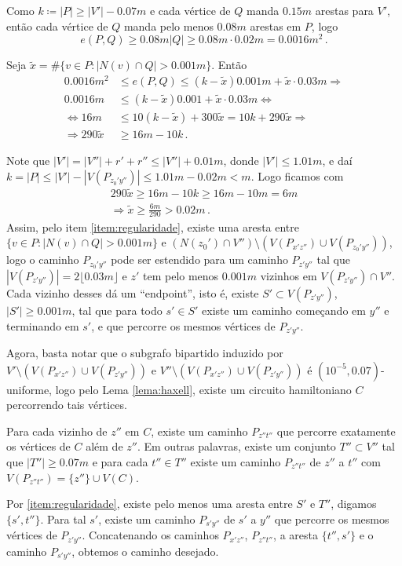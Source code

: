 \begin{dem}
	Como $k\coloneqq |P|\geq |V'| - 0.07m$ e cada vértice de $Q$ manda $0.15m$ arestas para $V'$, então cada vértice de $Q$ manda pelo menos $0.08m$ arestas em $P$, logo
	\[
		e(P,Q)\geq0.08m|Q|\geq0.08m\cdot0.02m = 0.0016m^2\,.
	\]
	
	Seja $\tilde{x} = \#\{v\in P: |N(v)\cap Q|>0.001m\}$. Então 
	\begin{align*}
		0.0016m^2&\leq  e(P,Q)\leq (k-\tilde{x})0.001m + \tilde{x}\cdot 0.03m\Longrightarrow \\
		0.0016m&\leq (k-\tilde{x})0.001 + \tilde{x}\cdot 0.03m\Longleftrightarrow \\
		\Longleftrightarrow 16m&\leq 10(k-\tilde{x}) + 300\tilde{x} = 10k + 290\tilde{x}\Longrightarrow \\
		\Longrightarrow 290\tilde{x}&\geq 16m - 10k\,.
	\end{align*}
	
	Note que $|V'| = |V''| + r' + r''\leq |V''| + 0.01m$, donde $|V'|\leq1.01m$, e daí $k = |P|\leq |V'| - |V(P_{z_0'y''})|\leq1.01m - 0.02m < m$. Logo ficamos com 
	\begin{gather*}
		290\tilde{x}\geq16m - 10k\geq16m - 10m = 6m \\
		\Longrightarrow \tilde{x}\geq \frac{6m}{290} > 0.02m\,.
	\end{gather*}
	Assim, pelo item \ref{item:regularidade}, existe uma aresta entre $\{v\in P: |N(v)\cap Q|>0.001m\}$ e $(N(z_0')\cap V'')\setminus(V(P_{x'z''})\cup V(P_{z_0'y''}))$, logo o caminho $P_{z_0'y''}$ pode ser estendido para um caminho $P_{z'y''}$ tal que $|V(P_{z'y''})| = 2\lfloor0.03m\rfloor$ e $z'$ tem pelo menos $0.001m$ vizinhos em $V(P_{z'y''})\cap V''$. Cada vizinho desses dá um ``endpoint'', isto é, existe $S'\subset V(P_{z'y''})$, $|S'|\geq0.001m$, tal que para todo $s'\in S'$ existe um caminho começando em $y''$ e terminando em $s'$, e que percorre os mesmos vértices de $P_{z'y''}$.
	
	Agora, basta notar que o subgrafo bipartido induzido por $V'\setminus(V(P_{x'z''})\cup V(P_{z'y''}))$ e $V''\setminus(V(P_{x'z''})\cup V(P_{z'y''}))$ é $(10^{-5}, 0.07)$-uniforme, logo pelo Lema \ref{lema:haxell}, existe um circuito hamiltoniano $C$ percorrendo tais vértices.
	
	Para cada vizinho de $z''$ em $C$, existe um caminho $P_{z''t''}$ que percorre exatamente os vértices de $C$ além de $z''$. Em outras palavras, existe um conjunto $T''\subset V''$ tal que $|T''|\geq0.07m$ e para cada $t''\in T''$ existe um caminho $P_{z''t''}$ de $z''$ a $t''$ com $V(P_{z''t''}) = \{z''\}\cup V(C)$.
	
	Por \ref{item:regularidade}, existe pelo menos uma aresta entre $S'$ e $T''$, digamos $\{s', t''\}$. Para tal $s'$, existe um caminho $P_{s'y''}$ de $s'$ a $y''$ que percorre os mesmos vértices de $P_{z'y''}$. Concatenando os caminhos $P_{x'z''}$, $P_{z''t''}$, a aresta $\{t'', s'\}$ e o caminho $P_{s'y''}$, obtemos o caminho desejado.
	
\end{dem}

